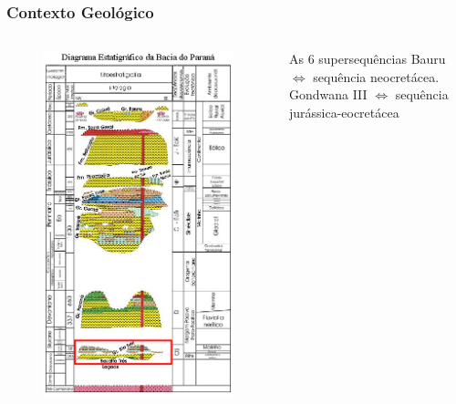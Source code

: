 \documentclass[10pt]{beamer} %
\begin{document}
\begin{frame}
	\frametitle{Contexto Geológico}
	\begin{columns}
		\begin{column}{0.4\textwidth}
			\begin{figure}
				\includegraphics[scale=0.36]{Imagens/diagramarioivai.png}
			\end{figure}
		\end{column}
		\begin{column}{0.75\textwidth}
			\begin{block}{As $6$ supersequências}
				Bauru $\Longleftrightarrow$  sequência neocretácea.\\
				Gondwana III $\Longleftrightarrow$ sequência jurássica-eocretácea\\

\end{block}
\end{column}
\end{columns}
\end{frame}
\end{document}
